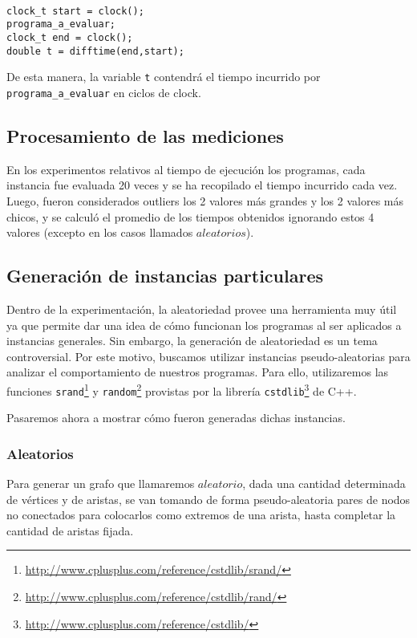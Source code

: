 \documentclass[a4paper]{article}
\begin{document}
\begin{verbatim}

clock_t start = clock();
programa_a_evaluar;
clock_t end = clock();
double t = difftime(end,start);

\end{verbatim}

De esta manera, la variable {\tt t} contendrá el tiempo incurrido por {\tt programa_a_evaluar} en ciclos de clock.

\subsection{Procesamiento de las mediciones}

En los experimentos relativos al tiempo de ejecución los programas, cada instancia fue evaluada 20 veces y se ha recopilado el tiempo incurrido cada vez. Luego, fueron considerados outliers los 2 valores más grandes y los 2 valores más chicos, y se calculó el promedio de los tiempos obtenidos ignorando estos 4 valores (excepto en los casos llamados $aleatorios$).

\subsection{Generación de instancias particulares}

Dentro de la experimentación, la aleatoriedad provee una herramienta muy útil ya que permite dar una idea de cómo funcionan los programas al ser aplicados a instancias generales. Sin embargo, la generación de aleatoriedad es un tema controversial.  Por este motivo, buscamos utilizar instancias pseudo-aleatorias para analizar el comportamiento de nuestros programas. Para ello, utilizaremos las funciones {\tt srand}\footnote{\url{http://www.cplusplus.com/reference/cstdlib/srand/}} y {\tt random}\footnote{\url{http://www.cplusplus.com/reference/cstdlib/rand/}} provistas por la librería {\tt cstdlib}\footnote{\url{http://www.cplusplus.com/reference/cstdlib/}} de C++.

Pasaremos ahora a mostrar cómo fueron generadas dichas instancias. 

\subsubsection{Aleatorios}

Para generar un grafo que llamaremos $aleatorio$, dada una cantidad determinada de vértices y de aristas, se van tomando de forma pseudo-aleatoria pares de nodos no conectados para colocarlos como extremos de una arista, hasta completar la cantidad de aristas fijada.
\end{document}
